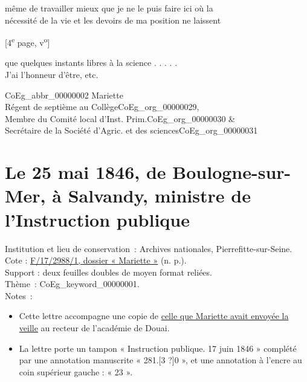 \documentclass{book}
\begin{document}
même de travailler mieux que je ne le puis faire ici où la\\
nécessité de la vie et les devoirs de ma position ne laissent
{\footnotesize \begin{center} {[4\textsuperscript{e} page, v\textsuperscript{o}]}\end{center}}
que quelques instants libres à la science . . . . .\\
\indent J’ai l’honneur d’être, etc.
\begin{center}\hspace{5cm}\gls{CoEg_abbr_00000002} Mariette\\
\hspace{5cm}Régent de septième au Collège\gls{CoEg_org_00000029},\\
\hspace{5cm}Membre du Comité local d’Inst. Prim.\gls{CoEg_org_00000030} \&\\
\hspace{5cm}Secrétaire de la Société d’Agric. et des sciences\gls{CoEg_org_00000031}\end{center}

\hypertarget{CoEg_Mariette_1846-05-25}{}

\section*{Le 25 mai 1846, de Boulogne-sur-Mer, à Salvandy, ministre de l’Instruction publique}
 \label{labCoEg_Mariette_1846-05-25}
{\footnotesize
\noindent Institution et lieu de conservation~: Archives nationales, Pierrefitte-sur-Seine.\\
Cote : \hyperlink{CoEg_Mariette_ms_002}{F/17/2988/1, dossier « Mariette »} (n. p.).\\
Support : deux feuilles doubles de moyen format reliées.\\
Thème~: \gls{CoEg_keyword_00000001}.\\
Notes~:
\begin{itemize}
\item Cette lettre accompagne une copie de \hyperlink{CoEg_Mariette_1846-05-24}{celle que Mariette avait envoyée la veille} au recteur de l’académie de Douai.
\item La lettre porte un tampon « Instruction publique. 17 juin 1846 » complété par une annotation manuscrite « 281.[3 ?]0 », et une annotation à l’encre au coin supérieur gauche : « 23 ».
\end{itemize}}
\end{document}
